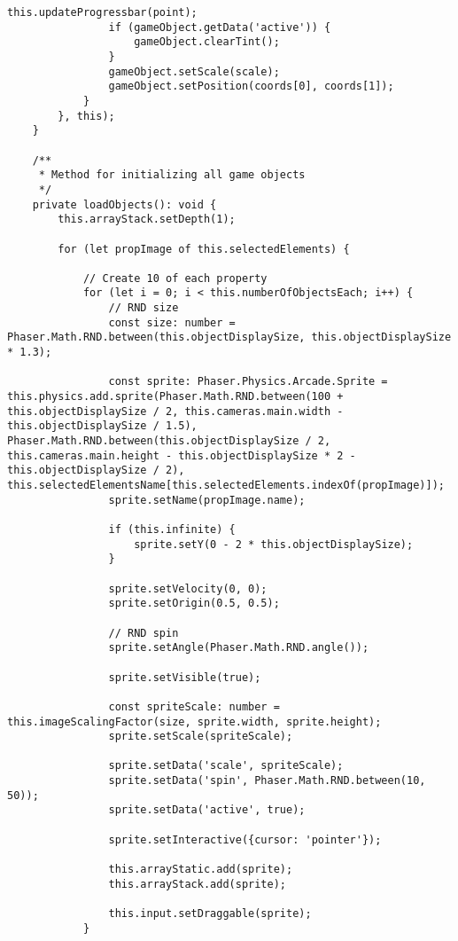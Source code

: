 \begin{lstlisting}[style=TypeScript, caption={propertySortingScene.ts}]
                this.updateProgressbar(point);
                if (gameObject.getData('active')) {
                    gameObject.clearTint();
                }
                gameObject.setScale(scale);
                gameObject.setPosition(coords[0], coords[1]);
            }
        }, this);
    }

    /**
     * Method for initializing all game objects
     */
    private loadObjects(): void {
        this.arrayStack.setDepth(1);

        for (let propImage of this.selectedElements) {

            // Create 10 of each property
            for (let i = 0; i < this.numberOfObjectsEach; i++) {
                // RND size
                const size: number = Phaser.Math.RND.between(this.objectDisplaySize, this.objectDisplaySize * 1.3);

                const sprite: Phaser.Physics.Arcade.Sprite = this.physics.add.sprite(Phaser.Math.RND.between(100 + this.objectDisplaySize / 2, this.cameras.main.width - this.objectDisplaySize / 1.5), Phaser.Math.RND.between(this.objectDisplaySize / 2, this.cameras.main.height - this.objectDisplaySize * 2 - this.objectDisplaySize / 2), this.selectedElementsName[this.selectedElements.indexOf(propImage)]);
                sprite.setName(propImage.name);

                if (this.infinite) {
                    sprite.setY(0 - 2 * this.objectDisplaySize);
                }

                sprite.setVelocity(0, 0);
                sprite.setOrigin(0.5, 0.5);

                // RND spin
                sprite.setAngle(Phaser.Math.RND.angle());

                sprite.setVisible(true);

                const spriteScale: number = this.imageScalingFactor(size, sprite.width, sprite.height);
                sprite.setScale(spriteScale);

                sprite.setData('scale', spriteScale);
                sprite.setData('spin', Phaser.Math.RND.between(10, 50));
                sprite.setData('active', true);

                sprite.setInteractive({cursor: 'pointer'});

                this.arrayStatic.add(sprite);
                this.arrayStack.add(sprite);

                this.input.setDraggable(sprite);
            }


\end{lstlisting}
